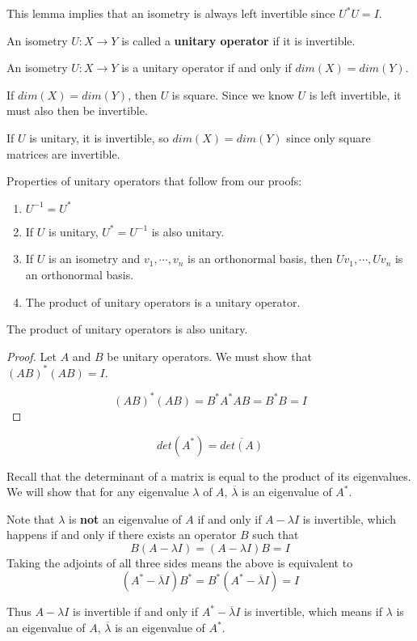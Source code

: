 This lemma implies that an isometry is always left invertible since $U^{*}U = I$. 

\begin{definition}
An isometry $U: X \rightarrow Y$ is called a \textbf{unitary operator} if it is invertible.  
\end{definition}

\begin{lemma}
An isometry $U: X \rightarrow Y$ is a unitary operator if and only if $dim(X) = dim(Y)$. 
\end{lemma}

\begin{lproof}
If $dim(X) = dim(Y)$, then $U$ is square. Since we know $U$ is left invertible, it must also then be invertible. 

If $U$ is unitary, it is invertible, so $dim(X) = dim(Y)$ since only square matrices are invertible. 
\end{lproof}

Properties of unitary operators that follow from our proofs: 
\begin{enumerate}
	\item $U^{-1} = U^{*}$ 
	\item If $U$ is unitary, $U^{*} = U^{-1}$ is also unitary. 
	\item If $U$ is an isometry and $v_{1}, \cdots, v_{n}$ is an orthonormal basis, then $Uv_{1}, \cdots, Uv_{n}$ is an orthonormal basis. 
	\item The product of unitary operators is a unitary operator. 
\end{enumerate}

\begin{theorem}
The product of unitary operators is also unitary. 
\end{theorem}

\begin{proof}
Let $A$ and $B$ be unitary operators. We must show that $(AB)^{*} (AB) = I$. 

$$(AB)^{*}(AB) = B^{*} A^{*} A B = B^{*} B = I$$
\end{proof}

\begin{lemma}
$$det(A^{*}) = \overline{det(A)}$$
\end{lemma}

\begin{lproof}
Recall that the determinant of a matrix is equal to the product of its eigenvalues. We will show that for any eigenvalue $\lambda$ of $A$, $\overline{\lambda}$ is an eigenvalue of $A^{*}$. 

Note that $\lambda$ is \textbf{not} an eigenvalue of $A$ if and only if $A - \lambda I$ is invertible, which happens if and only if there exists an operator $B$ such that 
$$B(A - \lambda I) = (A - \lambda I)B = I$$
Taking the adjoints of all three sides means the above is equivalent to 
$$(A^{*} - \overline{\lambda}I)B^{*} = B^{*} (A^{*} - \overline{\lambda}I) = I$$

Thus $A - \lambda I$ is invertible if and only if $A^{*} - \overline{\lambda}I$ is invertible, which means if $\lambda$ is an eigenvalue of $A$, $\overline{\lambda}$ is an eigenvalue of $A^{*}$. 
\end{lproof}

